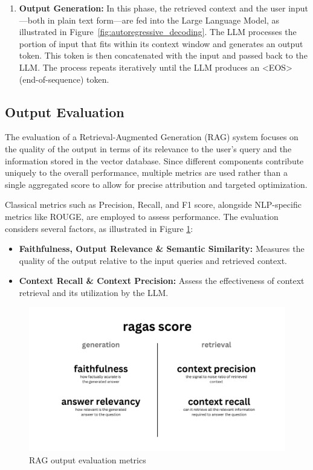 \begin{enumerate}[label=\alph*.]
\item \textbf{Output Generation:}
In this phase, the retrieved context and the user input—both in plain text form—are fed into the Large Language Model, as illustrated in Figure~\ref{fig:autoregressive_decoding}. The LLM processes the portion of input that fits within its context window and generates an output token. This token is then concatenated with the input and passed back to the LLM. The process repeats iteratively until the LLM produces an \textless{}EOS\textgreater{} (end-of-sequence) token.


\end{enumerate}

\subsection{Output Evaluation}
The evaluation of a Retrieval-Augmented Generation (RAG) system focuses on the quality of the output in terms of its relevance to the user's query and the information stored in the vector database. Since different components contribute uniquely to the overall performance, multiple metrics are used rather than a single aggregated score to allow for precise attribution and targeted optimization.

Classical metrics such as Precision, Recall, and F1 score, alongside NLP-specific metrics like ROUGE, are employed to assess performance. The evaluation considers several factors, as illustrated in Figure \ref{fig:RAGOutputevaluationmetrics}:
\begin{itemize}
    \item \textbf{Faithfulness, Output Relevance \& Semantic Similarity:} Measures the quality of the output relative to the input queries and retrieved context.
    \item \textbf{Context Recall \& Context Precision:} Assess the effectiveness of context retrieval and its utilization by the LLM.
\end{itemize}
\begin{figure}[H]
    \centering
    \includegraphics[width=0.56\linewidth]{images/rag-eval.png}
    \caption{RAG output evaluation metrics ~\cite{cardenas2023rag}}
    \label{fig:RAGOutputevaluationmetrics}
\end{figure}

